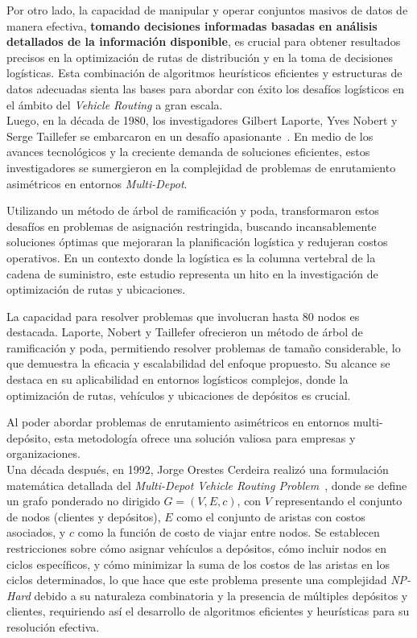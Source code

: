 \documentclass[letter, 10pt]{article}
\begin{document}
Por otro lado, la capacidad de manipular y operar conjuntos masivos de datos de manera efectiva, \textbf{tomando decisiones informadas basadas en análisis detallados de la información disponible}, es crucial para obtener resultados precisos en la optimización de rutas de distribución y en la toma de decisiones logísticas. Esta combinación de algoritmos heurísticos eficientes y estructuras de datos adecuadas sienta las bases para abordar con éxito los desafíos logísticos en el ámbito del \textit{Vehicle Routing} a gran escala.
\\

Luego, en la década de 1980, los investigadores Gilbert Laporte, Yves Nobert y Serge Taillefer se embarcaron en un desafío apasionante~\cite{SolvingAFamilyOfMultiDepot}. En medio de los avances tecnológicos y la creciente demanda de soluciones eficientes, estos investigadores se sumergieron en la complejidad de problemas de enrutamiento asimétricos en entornos \textit{Multi-Depot}.

Utilizando un método de árbol de ramificación y poda, transformaron estos desafíos en problemas de asignación restringida, buscando incansablemente soluciones óptimas que mejoraran la planificación logística y redujeran costos operativos. En un contexto donde la logística es la columna vertebral de la cadena de suministro, este estudio representa un hito en la investigación de optimización de rutas y ubicaciones.

La capacidad para resolver problemas que involucran hasta 80 nodos es destacada. Laporte, Nobert y Taillefer ofrecieron un método de árbol de ramificación y poda, permitiendo resolver problemas de tamaño considerable, lo que demuestra la eficacia y escalabilidad del enfoque propuesto. Su alcance se destaca en su aplicabilidad en entornos logísticos complejos, donde la optimización de rutas, vehículos y ubicaciones de depósitos es crucial.

Al poder abordar problemas de enrutamiento asimétricos en entornos multi-depósito, esta metodología ofrece una solución valiosa para empresas y organizaciones.
\\

Una década después, en 1992, Jorge Orestes Cerdeira realizó una formulación matemática detallada del \textit{Multi-Depot Vehicle Routing Problem}~\cite{MultiDepotVehicleRouting}, donde se define un grafo ponderado no dirigido $G = (V, E, c)$, con $V$ representando el conjunto de nodos (clientes y depósitos), $E$ como el conjunto de aristas con costos asociados, y $c$ como la función de costo de viajar entre nodos. Se establecen restricciones sobre cómo asignar vehículos a depósitos, cómo incluir nodos en ciclos específicos, y cómo minimizar la suma de los costos de las aristas en los ciclos determinados, lo que hace que este problema presente una complejidad \textit{NP-Hard} debido a su naturaleza combinatoria y la presencia de múltiples depósitos y clientes, requiriendo así el desarrollo de algoritmos eficientes y heurísticas para su resolución efectiva.
\end{document}
